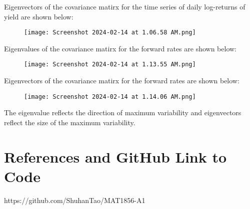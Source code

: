 \documentclass{article}
\begin{document}
\begin{enumerate}
        Eigenvectors of the covariance matirx for the time series of daily log-returns of yield are shown below:
        \begin{figure}[H]
            \centering
            \texttt{[image: Screenshot 2024-02-14 at 1.06.58 AM.png]}
        \end{figure}
        
        Eigenvalues of the covariance matirx for the forward rates are shown below:
        \begin{figure}[H]
            \centering
            \texttt{[image: Screenshot 2024-02-14 at 1.13.55 AM.png]}
        \end{figure}
        
        Eigenvectors of the covariance matirx for the forward rates are shown below:
        \begin{figure}[H]
            \centering
            \texttt{[image: Screenshot 2024-02-14 at 1.14.06 AM.png]}
        \end{figure}
        
        The eigenvalue reflects the direction of maximum variability and eigenvectors reflect the size of the maximum variability.
\end{enumerate}

\section*{References and GitHub Link to Code}
https://github.com/ShuhanTao/MAT1856-A1
\end{document}
